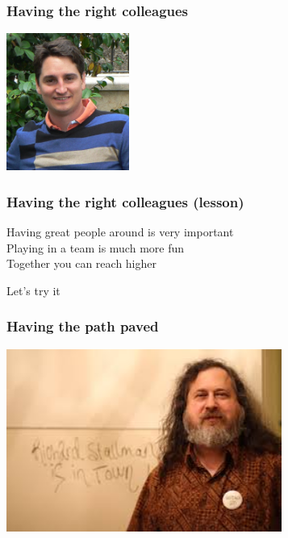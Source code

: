\documentclass[17pt,aspectratio=169,hyperref=pdfusetitle]{beamer}
\begin{document}
\begin{frame}[fragile]
  \frametitle{Having the right colleagues}

  \begin{center}
  \includegraphics[height=4.5cm]{figs/gregorio-robles}
  \end{center}  
  
\end{frame}

\begin{frame}[fragile]
  \frametitle{Having the right colleagues (lesson)}

  Having great people around is very important \\
  Playing in a team is much more fun \\
  Together you can reach higher \\
  
  \begin{center}
    Let's try it
  \end{center}  
  
\end{frame}

\begin{frame}[fragile]
  \frametitle{Having the path paved}

  \begin{center}
  \includegraphics[height=6cm]{figs/foto-rms}
  \end{center}  
  
\end{frame}
\end{document}
